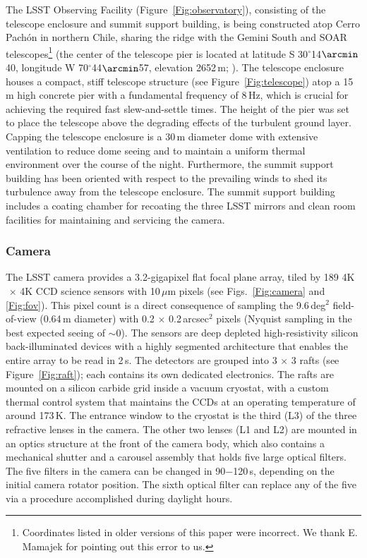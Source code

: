 The LSST Observing Facility (Figure~\ref{Fig:observatory}),
consisting of the telescope enclosure and summit support building, is being constructed atop Cerro Pach\'{o}n in northern Chile,
sharing the ridge with the Gemini South and SOAR telescopes\footnote{Coordinates listed in older versions
of this paper were incorrect. We thank E. Mamajek for pointing out this error to us.}
(the center of the telescope pier is located at latitude S 30$^\circ$14$\arcmin$40,
longitude W 70$^\circ$44$\arcmin$57, elevation 2652\,m;
\citealt{2012arXiv1210.1616M}).  The telescope enclosure houses a compact, stiff
telescope structure (see Figure~\ref{Fig:telescope}) atop a 15\,m high concrete pier
with a fundamental frequency of 8\,Hz, which is crucial for achieving the required fast slew-and-settle times.  The height of the pier was set to place the telescope above the degrading
effects of the turbulent ground layer.  Capping the telescope
enclosure is a 30\,m diameter dome with extensive ventilation to reduce
dome seeing
and to maintain a uniform thermal environment over the course of the night.  Furthermore, the summit support
building has been oriented with respect to the prevailing winds to shed its turbulence away from the
telescope enclosure.  The summit support building includes a coating chamber for recoating the three LSST mirrors and
clean room facilities for maintaining and servicing the camera.


\subsubsection{ Camera }


The LSST camera provides a 3.2-gigapixel flat focal plane array, tiled by 189
4K$\,\times\,$4K CCD science sensors with 10\,$\mu$m pixels (see Figs.~\ref{Fig:camera}
and \ref{Fig:fov}). This pixel count is a direct consequence of sampling the
9.6\,deg$^2$ field-of-view (0.64\,m diameter) with 0.2$\,\times\,$0.2\,arcsec$^2$
pixels (Nyquist sampling in the best expected seeing of $\sim$0).
The sensors are deep depleted high-resistivity silicon back-illuminated devices with
a highly segmented architecture that enables the entire array to be read in 2\,s.
The detectors are grouped into 3$\,\times\,$3 rafts (see Figure~\ref{Fig:raft}); each
contains its own dedicated electronics. The rafts are mounted on a silicon carbide
grid inside a vacuum cryostat, with a custom thermal control system that maintains
the CCDs at an operating temperature of around 173\,K. The entrance window to the
cryostat is the third (L3) of the three refractive lenses in the camera. The other
two lenses (L1 and L2) are mounted in an optics structure at the front of the camera
body, which also contains a mechanical shutter and a carousel assembly that holds
five large optical filters. The five filters in the camera can be changed in 90$-$120\,s,
depending on the initial camera rotator position. The sixth optical filter can
replace any of the five via a procedure accomplished during daylight hours.

